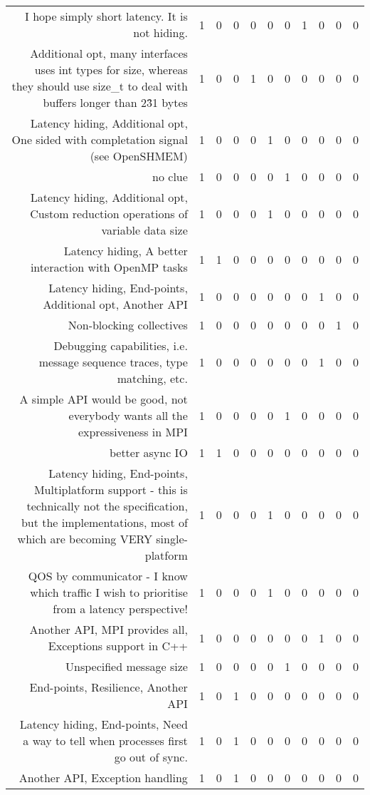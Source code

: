 {\begin{landscape}
\begin{longtable}[htb]{r|c|c|c|c|c|c|c|c|c|c}
{I hope simply short latency.  It is not hiding.} & 1 & 0 & 0 & 0 & 0 & 0 & 1 & 0 & 0 & 0 \\%
{Additional opt, many interfaces uses int types for size, whereas they should use size\_t to deal with buffers longer than 2\^31 bytes} & 1 & 0 & 0 & 1 & 0 & 0 & 0 & 0 & 0 & 0 \\%
{Latency hiding, Additional opt, One sided with completation signal (see OpenSHMEM)} & 1 & 0 & 0 & 0 & 1 & 0 & 0 & 0 & 0 & 0 \\%
{no clue} & 1 & 0 & 0 & 0 & 0 & 1 & 0 & 0 & 0 & 0 \\%
{Latency hiding, Additional opt, Custom reduction operations of variable data size} & 1 & 0 & 0 & 0 & 1 & 0 & 0 & 0 & 0 & 0 \\%
{Latency hiding, A better interaction with OpenMP tasks} & 1 & 1 & 0 & 0 & 0 & 0 & 0 & 0 & 0 & 0 \\%
{Latency hiding, End-points, Additional opt, Another API} & 1 & 0 & 0 & 0 & 0 & 0 & 0 & 1 & 0 & 0 \\%
{Non-blocking collectives} & 1 & 0 & 0 & 0 & 0 & 0 & 0 & 0 & 1 & 0 \\%
{Debugging capabilities, i.e. message sequence traces, type matching, etc.} & 1 & 0 & 0 & 0 & 0 & 0 & 0 & 1 & 0 & 0 \\%
{A simple API would be good, not everybody wants all the expressiveness in MPI} & 1 & 0 & 0 & 0 & 0 & 1 & 0 & 0 & 0 & 0 \\%
{better async IO} & 1 & 1 & 0 & 0 & 0 & 0 & 0 & 0 & 0 & 0 \\%
{Latency hiding, End-points, Multiplatform support - this is technically not the specification, but the implementations, most of which are becoming VERY single-platform} & 1 & 0 & 0 & 0 & 1 & 0 & 0 & 0 & 0 & 0 \\%
{QOS by communicator - I know which traffic I wish to prioritise from a latency perspective!} & 1 & 0 & 0 & 0 & 1 & 0 & 0 & 0 & 0 & 0 \\%
{Another API, MPI provides all, Exceptions support in C++} & 1 & 0 & 0 & 0 & 0 & 0 & 0 & 1 & 0 & 0 \\%
{Unspecified message size} & 1 & 0 & 0 & 0 & 0 & 1 & 0 & 0 & 0 & 0 \\%
{End-points, Resilience, Another API} & 1 & 0 & 1 & 0 & 0 & 0 & 0 & 0 & 0 & 0 \\%
{Latency hiding, End-points, Need a way to tell when processes first go out of sync.} & 1 & 0 & 1 & 0 & 0 & 0 & 0 & 0 & 0 & 0 \\%
{Another API, Exception handling} & 1 & 0 & 1 & 0 & 0 & 0 & 0 & 0 & 0 & 0 \\%

\end{longtable}
\end{landscape}}
